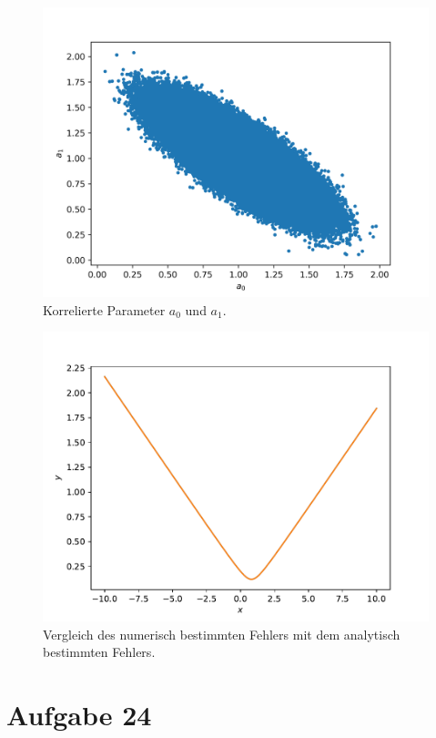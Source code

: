 \documentclass[a4paper, 11pt]{article}
\begin{document}
\FloatBarrier

\begin{figure}
    \centering
    \includegraphics[width=\textwidth]{../A23/A23_scatter.png}
    \caption{Korrelierte Parameter $a_0$ und $a_1$.}
\end{figure}
\begin{figure}
    \centering
    \includegraphics[width=\textwidth]{../A23/A23_resultat.pdf}
    \caption{Vergleich des numerisch bestimmten Fehlers mit dem analytisch bestimmten Fehlers.}
\end{figure}
\FloatBarrier

\section*{Aufgabe 24}
\end{document}
